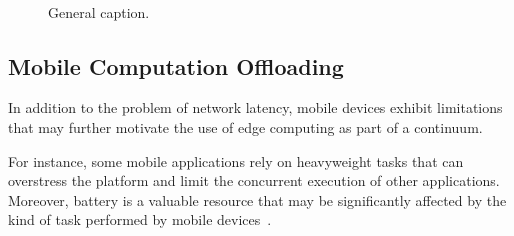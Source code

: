 
\begin{figure}[tbp]
	\centering
	\hfill
	~
	\hfill
	\caption{General caption.} \label{fig:1}
\end{figure}

\subsection{Mobile Computation Offloading}

In addition to the problem of network latency, mobile devices exhibit limitations that may further motivate the use of edge computing as part of a continuum. 

For instance, some mobile applications rely on heavyweight tasks that can overstress the platform and limit the concurrent execution of other applications. Moreover, battery is a valuable resource that may be significantly affected by the kind of task performed by mobile devices~\cite{Carroll:2010}. 

